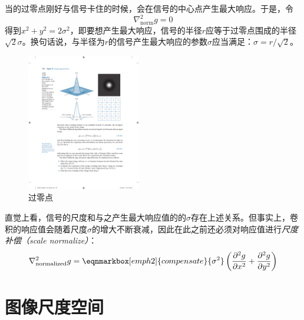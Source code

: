 \begin{intu}
	当\lpl 的过零点刚好与信号卡住的时候，会在信号的中心点产生最大响应。于是，令
	\begin{equation*}
		\nabla^2_{\text{norm}}g = 0
	\end{equation*}
	得到$x^2+y^2=2\sigma^2$，即要想产生最大响应，信号的半径$r$应等于\lpl 过零点围成的半径$\sqrt{2}\sigma$。换句话说，与半径为$r$的信号产生最大响应的\lpl 参数$\sigma$应当满足：$\sigma=r / \sqrt{2}$。
	\begin{figure}[H]
		\centering
		\includegraphics[height=6cm]{fig/LoG zero crossings.pdf}
		\caption{\lpl 过零点}
	\end{figure}
\end{intu}

直觉上看，信号的尺度和与之产生最大响应值的\lpl 的$\sigma$存在上述关系。但事实上，卷积的响应值会随着尺度$\sigma$的增大不断衰减，因此在此之前还必须对响应值进行\emph{尺度补偿（scale normalize）}：
\begin{equation}
	\nabla^2_{\text{normalized}}g=\eqnmarkbox[emph2]{compensate}{\sigma^2}\left(\frac{\partial^2 g}{\partial x^2} + \frac{\partial^2 g}{\partial y^2}\right)
\end{equation}

\section{图像尺度空间}\label{sec:图像尺度空间}

